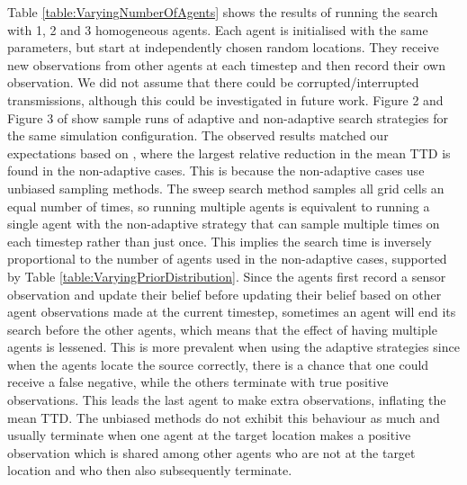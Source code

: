 Table \ref{table:VaryingNumberOfAgents} shows the results of running the search with 1, 2 and 3 homogeneous agents. Each agent is initialised with the same parameters, but start at independently chosen random locations. They receive new observations from other agents at each timestep and then record their own observation. We did not assume that there could be corrupted/interrupted transmissions, although this could be investigated in future work.
Figure 2 and Figure 3 of \cite{Chung2008Multi-agentFramework} show sample runs of adaptive and non-adaptive search strategies for the same simulation configuration. The observed results matched our expectations based on \cite{Chung2008Multi-agentFramework}, where the largest relative reduction in the mean TTD is found in the non-adaptive cases. This is because the non-adaptive cases use unbiased sampling methods. The sweep search method samples all grid cells an equal number of times, so running multiple agents is equivalent to running a single agent with the non-adaptive strategy that can sample multiple times on each timestep rather than just once. This implies the search time is inversely proportional to the number of agents used in the non-adaptive cases, supported by Table \ref{table:VaryingPriorDistribution}. Since the agents first record a sensor observation and update their belief before updating their belief based on other agent observations made at the current timestep, sometimes an agent will end its search before the other agents, which means that the effect of having multiple agents is lessened. This is more prevalent when using the adaptive strategies since when the agents locate the source correctly, there is a chance that one could receive a false negative, while the others terminate with true positive observations. This leads the last agent to make extra observations, inflating the mean TTD. The unbiased methods do not exhibit this behaviour as much and usually terminate when one agent at the target location makes a positive observation which is shared among other agents who are not at the target location and who then also subsequently terminate.

